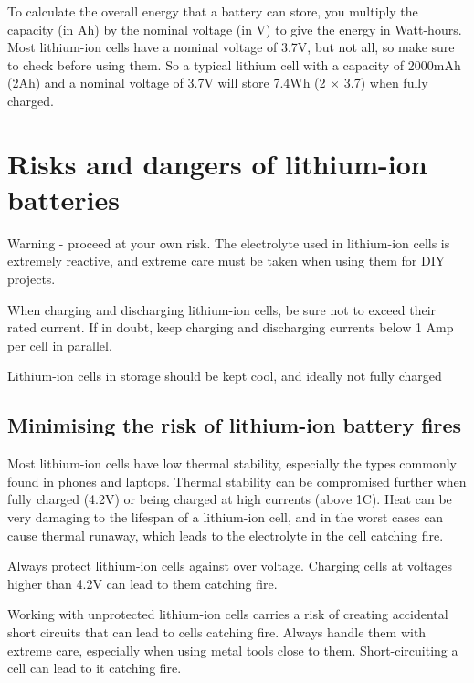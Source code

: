 \documentclass{article}
\theoremstyle{definition}
\theoremstyle{definition}
\theoremstyle{remark}
\begin{document}
    To calculate the overall energy that a battery can store, you multiply the capacity (in Ah) by the nominal voltage (in V) to give the energy in Watt-hours. Most lithium-ion cells have a nominal voltage of 3.7V, but not all, so make sure to check before using them. So a typical lithium cell with a capacity of 2000mAh (2Ah) and a nominal voltage of 3.7V will store 7.4Wh (2 \(\times\) 3.7) when fully charged.
  


\section{Risks and dangers of lithium-ion batteries} %
\label{sec:risks_and_dangers_of_lithium_ion_batteries}

  Warning - proceed at your own risk. The electrolyte used in lithium-ion cells is extremely reactive, and extreme care must be taken when using them for DIY projects.

  When charging and discharging lithium-ion cells, be sure not to exceed their rated current. If in doubt, keep charging and discharging currents below 1 Amp per cell in parallel.

  Lithium-ion cells in storage should be kept cool, and ideally not fully charged

  \subsection{Minimising the risk of lithium-ion battery fires} %
  \label{sub:minimising_the_risk_of_lithium_ion_battery_fires}
  
    Most lithium-ion cells have low thermal stability, especially the types commonly found in phones and laptops. Thermal stability can be compromised further when fully charged (4.2V) or being charged at high currents (above 1C). Heat can be very damaging to the lifespan of a lithium-ion cell, and in the worst cases can cause thermal runaway, which leads to the electrolyte in the cell catching fire.

    Always protect lithium-ion cells against over voltage. Charging cells at voltages higher than 4.2V can lead to them catching fire.

    Working with unprotected lithium-ion cells carries a risk of creating accidental short circuits that can lead to cells catching fire. Always handle them with extreme care, especially when using metal tools close to them. Short-circuiting a cell can lead to it catching fire.
\end{document}
